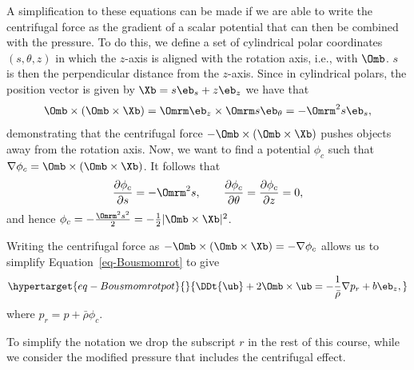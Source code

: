 \documentclass[
  letterpaper,
  twocolumn,
  landscape]{report}
\begin{document}
A simplification to these equations can be made if we are able to write
the centrifugal force as the gradient of a scalar potential that can
then be combined with the pressure. To do this, we define a set of
cylindrical polar coordinates \((s,\theta,z)\) in which the \(z\)-axis
is aligned with the rotation axis, i.e., with \(\Omb\). \(s\) is then
the perpendicular distance from the \(z\)-axis. Since in cylindrical
polars, the position vector is given by \(\Xb = s\eb_s+z\eb_z\) we have
that \[
\Omb\times(\Omb\times\Xb) = \Omrm\eb_z \times \Omrm s \eb_\theta = -\Omrm^2 s \eb_s,
\] demonstrating that the centrifugal force
\(-\Omb\times(\Omb\times\Xb)\) pushes objects away from the rotation
axis. Now, we want to find a potential \(\phi_c\) such that
\(\nabla \phi_c = \Omb\times(\Omb\times\Xb)\). It follows that \[
\frac{\partial \phi_c}{\partial s} = -\Omrm^2s, \quad \quad \frac{\partial \phi_c}{\partial \theta} = \frac{\partial \phi_c}{\partial z} = 0,
\] and hence
\(\phi_c = -\frac{\Omrm^2s^2}{2} = -\frac{1}{2}|\Omb \times \Xb|^2\).

Writing the centrifugal force as
\(-\Omb\times(\Omb\times\Xb) = -\nabla \phi_c\) allows us to simplify
Equation~\ref{eq-Bousmomrot} to give
\begin{equation}\protect\hypertarget{eq-Bousmomrotpot}{}{  \DDt{\ub}  +2\Omb\times\ub  = -\frac{1}{\bar\rho}\nabla p_r + b \eb_z,}\label{eq-Bousmomrotpot}\end{equation}
where \(p_r = p + \bar\rho\phi_c\).

\begin{tcolorbox}[enhanced jigsaw, toprule=.15mm, left=2mm, opacityback=0, breakable, arc=.35mm, colback=white, rightrule=.15mm, bottomrule=.15mm, colframe=quarto-callout-note-color-frame, leftrule=.75mm]
\begin{minipage}[t]{5.5mm}
\textcolor{quarto-callout-note-color}{\faInfo}
\end{minipage}%
\begin{minipage}[t]{\textwidth - 5.5mm}

To simplify the notation we drop the subscript \(r\) in the rest of this
course, while we consider the modified pressure that includes the
centrifugal effect.

\end{minipage}%
\end{tcolorbox}
\end{document}
